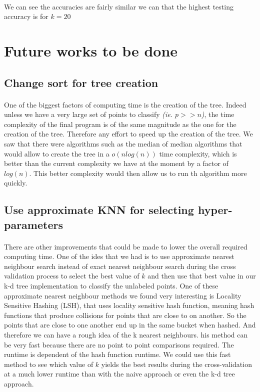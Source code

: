 \documentclass[11 pt]{article}
\begin{document}
\paragraph{}We can see the accuracies are fairly similar we can that the highest testing accuracy is for $k=20$


\section{Future works to be done}

\subsection{Change sort for tree creation}
\paragraph{}One of the biggest factors of computing time is the creation of the tree. Indeed unless we have a very large set of points to classify \emph{(ie. $p>>n$)}, the time complexity of the final program is of the same magnitude as the one for the creation of the tree. Therefore any effort to speed up the creation of the tree. We saw that there were algorithms such as the median of median algorithms that would allow to create the tree in a $o(nlog(n))$ time complexity, which is better than the current complexity we have at the moment by a factor of $log(n)$. This better complexity would then allow us to run th algorithm more quickly.

\subsection{Use approximate KNN for selecting hyper-parameters}
\paragraph{}There are other improvements that could be made to lower the overall required computing time. One of the ides that we had is to use approximate nearest neighbour search instead of exact nearest neighbour search during the cross validation process to select the best value of $k$ and then use that best value in our k-d tree implementation to classify the unlabeled points. One of these approximate nearest neighbour methods we found very interesting is Locality Sensitive Hashing (LSH), that uses locality sensitive hash function, meaning hash functions that produce collisions for points that are close to on another. So the points that are close to one another end up in the same bucket when hashed. And therefore we can have a rough idea of the k nearest neighbours. his method can be very fast because there are no point to point comparisons required. The runtime is dependent of the hash function runtime. We could use this fast method to see which value of $k$ yields the best results during the cross-validation at a much lower runtime than with the naive approach or even the k-d tree approach.
\end{document}
